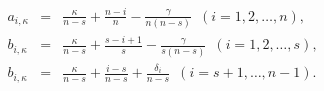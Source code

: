 \begin{equation}
\begin{array}{rcl}
a_{i,\kappa}&=&\frac{\kappa}{n-s}+\frac{n-i}{n}-\frac{\gamma}{n(n-s)}
\,\,\, (i=1,2,\dots,n),\\
b_{i,\kappa}&=&\frac{\kappa}{n-s}+\frac{s-i+1}{s}-\frac{\gamma}{s(n-s)}
\,\,\, (i=1,2,\dots,s),\\
b_{i,\kappa}&=&\frac{\kappa}{n-s}+\frac{i-s}{n-s}+\frac{\delta_{i}}{n-s}
\,\,\, (i=s+1,\dots,n-1).
\end{array}
\end{equation}

